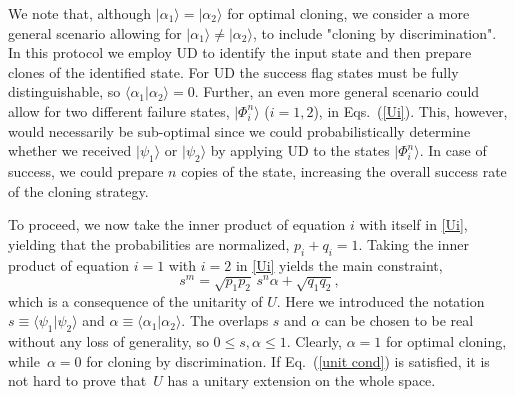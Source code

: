 \documentclass[aps,prl,twocolumn,showpacs]{revtex4}
\newcommand{\ke}[1]{|#1\rangle}
\newcommand{\bk}[2]{\langle #1|#2\rangle}
\begin{document}
We note that, although $|\alpha_1\rangle=|\alpha_2\rangle$ for optimal cloning, we consider a more general scenario allowing for $|\alpha_1\rangle \neq |\alpha_2\rangle$, to include "cloning by discrimination". In this protocol we employ UD to identify the input state and then prepare clones of the identified state. For UD the success flag states must be fully distinguishable, so $\langle\alpha_1|\alpha_2\rangle=0$. Further, an even more general scenario could allow for two different failure states, $|\Phi_i^{n}\rangle$ ($i=1,2$), in Eqs.~(\ref{Ui}). This, however, would necessarily be sub-optimal since we could probabilistically determine whether we received $\ke{\psi_1}$ or $\ke{\psi_2}$ by applying UD to the states $\ke {\Phi_i^{n}}$.  In case of success, we could prepare $n$ copies of the state, increasing the overall success rate of the cloning strategy.

To proceed, we now take the inner product of equation $i$ with itself in \eqref{Ui}, yielding that the probabilities are normalized, $p_i+q_i=1$. Taking the inner product of equation $i=1$ with $i=2$ in \eqref{Ui} yields the main constraint, 
%
\begin{equation}
s^m=\sqrt{p_1 p_2}\, s^n \alpha+\sqrt{q_1 q_2},
\label{unit cond}
\end{equation}
%
which is a consequence of the unitarity of $U$. Here we introduced the notation $s \equiv \bk {\psi_1}{\psi_2}$ and  $\alpha \equiv \langle\alpha_1|\alpha_2\rangle$. The overlaps $s$ and $\alpha$ can be chosen to be real without any loss of generality, so $0 \le s, \alpha \le 1$.  Clearly, $\alpha=1$ for optimal cloning, while~$\alpha=0$ for cloning by discrimination. If Eq.~(\ref{unit cond}) is satisfied, it is not hard to prove that~$U$ has a unitary extension on the whole space. %
\end{document}
